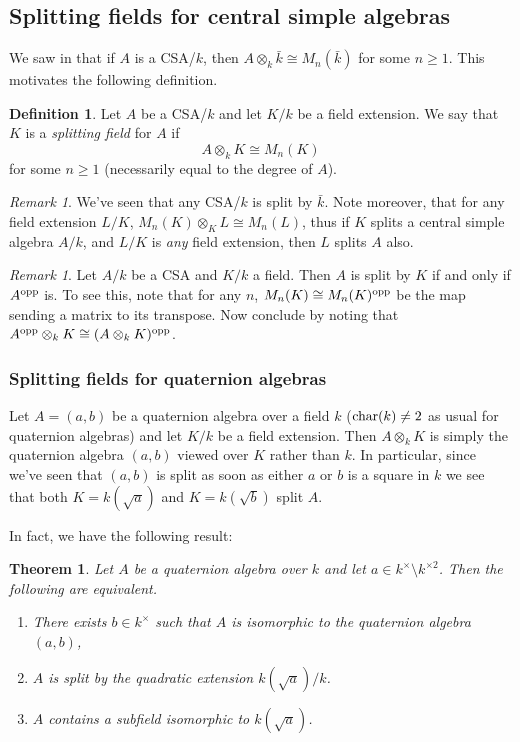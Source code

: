 \documentclass[11pt]{amsart}
\numberwithin{equation}{section}
\newtheorem{theorem}[equation]{Theorem}
\theoremstyle{remark}
\newtheorem{remark}[equation]{Remark}
\theoremstyle{remark}
\theoremstyle{remark}
\theoremstyle{definition}
\theoremstyle{definition}
\theoremstyle{definition}
\newtheorem{defi}[equation]{Definition}
\theoremstyle{definition}
\theoremstyle{definition}
\theoremstyle{definition}
\begin{document}
\subsection{Splitting fields for central simple algebras}

We saw in  that if $A$ is a CSA/$k$, then $A\otimes_k \bar{k}\cong M_n(\bar{k})$ for some $n\geq 1$. This motivates the following definition.

\begin{defi}
Let $A$ be a CSA/$k$ and let $K/k$ be a field extension. We say that $K$ is a \textit{splitting field} for $A$ if 
\[A\otimes_k K\cong M_n(K)\]
for some $n\geq 1$ (necessarily equal to the degree of $A$).
\end{defi}

\begin{remark}
We've seen that any CSA/$k$ is split by $\bar{k}$. Note moreover, that for any field extension $L/K$, $M_n(K)\otimes_K L\cong M_n(L)$, thus if $K$ splits a central simple algebra $A/k$, and $L/K$ is \textit{any} field extension, then $L$ splits $A$ also.
\end{remark}

\begin{remark} \label{splitting of opposite algebra}
Let $A/k$ be a CSA and $K/k$ a field. Then $A$ is split by $K$ if and only if $A^\textup{opp}$ is. To see this, note that for any $n$, $M_n(K)\cong M_n(K)^{\textup{opp}}$ be the map sending a matrix to its transpose. Now conclude by noting that $A^\textup{opp}\otimes_k K\cong (A\otimes_k K)^{\textup{opp}}$.
\end{remark}

\subsubsection{Splitting fields for quaternion algebras}

Let $A=(a,b)$ be a quaternion algebra over a field $k$ ($\textup{char}(k)\neq 2$ as usual for quaternion algebras) and let $K/k$ be a field extension. Then $A\otimes_kK$ is simply the quaternion algebra $(a,b)$ viewed over $K$ rather than $k$. In particular, since we've seen that $(a,b)$ is split as soon as either $a$ or $b$ is a square in $k$ we see that both $K=k(\sqrt{a})$ and $K=k(\sqrt{b})$ split $A$. 

In fact, we have the following result:

\begin{theorem} \label{split quaternion theorem}
Let $A$ be a quaternion algebra over $k$ and let $a\in k^{\times}\setminus k^{\times 2}$. Then the following are equivalent.
\begin{enumerate}
\item There exists $b\in k^{\times}$ such that $A$ is isomorphic to the quaternion algebra $(a,b)$,
\item $A$ is split by the quadratic extension $k(\sqrt{a})/k$.
\item $A$ contains a subfield isomorphic to $k(\sqrt{a})$.
\end{enumerate}
\end{theorem}
\end{document}
